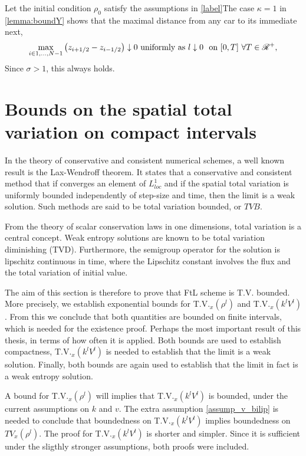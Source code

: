 \begin{corollary} \label{corollary:convergence_init_cond}
	Let the initial condition $\rho_0$ satisfy the assumptions in \eqref{label}The case $\kappa = 1$ in \eqref{lemma:boundY} shows that the maximal distance from any car to its immediate next,
	\begin{equation} \label{corollary}
		\max_{i \in {1,...,N-1}} \left(z_{i+1/2} - z_{i-1/2}\right) \downarrow 0\text{ uniformly as } l \downarrow 0 \, \, \text{ on } [0,T] \,\, \forall T \in \mathscr{R}^+,
	\end{equation}
	Since  $\sigma > 1$, this always holds. 
\end{corollary}





\section{Bounds on the spatial total variation on compact intervals}

In the theory of conservative and consistent numerical schemes, a well known result is the Lax-Wendroff theorem. It states that a conservative and consistent method that if converges an element of $L^1_{loc}$ and if the spatial total variation is uniformly bounded independently of step-size and time, then the limit is a weak solution. Such methods are said to be total variation bounded, or $TVB$. 

From the theory of scalar conservation laws in one dimensions, total variation is a central concept. Weak entropy solutions are known to be total variation diminishing (TVD). Furthermore, the semigroup operator for the solution is lipschitz continuous in time, where the Lipschitz constant involves the flux and the total variation of initial value.

The aim of this section is therefore to prove that FtL scheme is T.V. bounded. More precisely, we establish exponential bounds for T.V.$_x(\rho^l)$ and T.V.$_x(k^l V^l)$. From this we conclude that both quantities are bounded on finite intervals, which is needed for the existence proof. Perhaps the most important result of this thesis, in terms of how often it is applied. Both bounds are used to establish compactness, T.V.$_x(k^l V^l)$ is needed to establish that the limit is a weak solution. Finally, both bounds are again used to establish that the limit in fact is a weak entropy solution.  

A bound for T.V.$_x(\rho^l)$ will implies that T.V.$_x(k^l V^l)$ is bounded, under the current assumptions on $k$ and $v$. The extra assumption \eqref{assump_v_bilip} is needed to conclude that boundedness on T.V.$_x(k^l V^l)$ implies boundedness on $TV_x(\rho^l)$. The proof for T.V.$_x(k^l V^l)$ is shorter and simpler. Since it is sufficient under the sligthly stronger assumptions, both proofs were included. 

